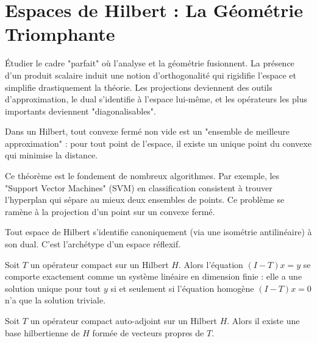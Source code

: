 \section{Espaces de Hilbert : La Géométrie Triomphante}

\begin{objectif}
    Étudier le cadre "parfait" où l'analyse et la géométrie fusionnent. La présence d'un produit scalaire induit une notion d'orthogonalité qui rigidifie l'espace et simplifie drastiquement la théorie. Les projections deviennent des outils d'approximation, le dual s'identifie à l'espace lui-même, et les opérateurs les plus importants deviennent "diagonalisables".
\end{objectif}

\begin{theorem}
    Dans un Hilbert, tout convexe fermé non vide est un "ensemble de meilleure approximation" : pour tout point de l'espace, il existe un unique point du convexe qui minimise la distance.
\end{theorem}

\begin{application}
    Ce théorème est le fondement de nombreux algorithmes. Par exemple, les "Support Vector Machines" (SVM) en classification consistent à trouver l'hyperplan qui sépare au mieux deux ensembles de points. Ce problème se ramène à la projection d'un point sur un convexe fermé.
\end{application}

\begin{theorem}
    Tout espace de Hilbert s'identifie canoniquement (via une isométrie antilinéaire) à son dual. C'est l'archétype d'un espace réflexif.
\end{theorem}

\begin{theorem}
    Soit $T$ un opérateur compact sur un Hilbert $H$. Alors l'équation $(I-T)x=y$ se comporte exactement comme un système linéaire en dimension finie : elle a une solution unique pour tout $y$ si et seulement si l'équation homogène $(I-T)x=0$ n'a que la solution triviale.
\end{theorem}

\begin{theorem}
    Soit $T$ un opérateur compact auto-adjoint sur un Hilbert $H$. Alors il existe une base hilbertienne de $H$ formée de vecteurs propres de $T$.
\end{theorem}

